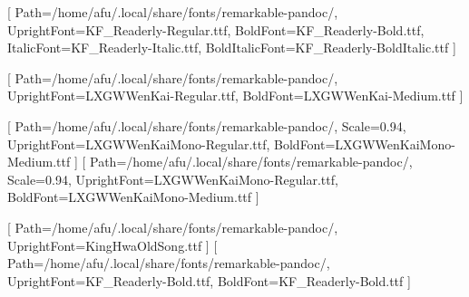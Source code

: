 
\usepackage{graphicx}

\usepackage{xcolor}

\pagecolor{rmpaper}
\AtBeginDocument{\color{rmink}}

\usepackage{fontspec}
\usepackage{xeCJK}
\def\rmfonts{/home/afu/.local/share/fonts/remarkable-pandoc/}
\def\lxgw{/home/afu/.local/share/fonts/remarkable-pandoc/}
\def\rmassets{/home/afu/.local/share/fonts/remarkable-pandoc/}

\setmainfont{KF Readerly}[
  Path=\rmfonts,
  UprightFont=KF_Readerly-Regular.ttf,
  BoldFont=KF_Readerly-Bold.ttf,
  ItalicFont=KF_Readerly-Italic.ttf,
  BoldItalicFont=KF_Readerly-BoldItalic.ttf ]

[
  Path=\lxgw,
  UprightFont=LXGWWenKai-Regular.ttf,
  BoldFont=LXGWWenKai-Medium.ttf ]

\setmonofont{LXGW WenKai Mono}[
  Path=\lxgw, Scale=0.94,
  UprightFont=LXGWWenKaiMono-Regular.ttf,
  BoldFont=LXGWWenKaiMono-Medium.ttf ]
[
  Path=\lxgw, Scale=0.94,
  UprightFont=LXGWWenKaiMono-Regular.ttf,
  BoldFont=LXGWWenKaiMono-Medium.ttf ]

[ Path=\rmassets, UprightFont=KingHwaOldSong.ttf ]
\newfontfamily{}[ Path=\rmfonts,
  UprightFont=KF_Readerly-Bold.ttf, BoldFont=KF_Readerly-Bold.ttf ]
\newcommand{\rmHeadFont}{\rmHeadLatin\CJKfamily{rmheadcjk}}

